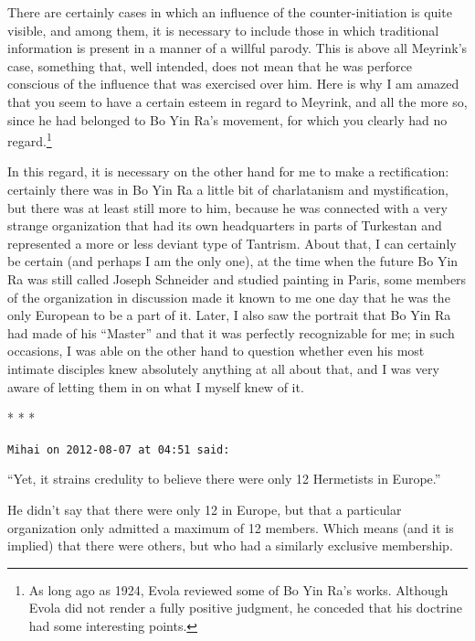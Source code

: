 There are certainly cases in which an influence of the counter-initiation is quite visible, and among them, it is necessary to include those in which traditional information is present in a manner of a willful parody. This is above all Meyrink's case, something that, well intended, does not mean that he was perforce conscious of the influence that was exercised over him. Here is why I am amazed that you seem to have a certain esteem in regard to Meyrink, and all the more so, since he had belonged to Bo Yin Ra's movement, for which you clearly had no regard.\footnote{As long ago as 1924, Evola reviewed some of Bo Yin Ra's works. Although Evola did not render a fully positive judgment, he conceded that his doctrine had some interesting points.}

In this regard, it is necessary on the other hand for me to make a rectification: certainly there was in Bo Yin Ra a little bit of charlatanism and mystification, but there was at least still more to him, because he was connected with a very strange organization that had its own headquarters in parts of Turkestan and represented a more or less deviant type of Tantrism. About that, I can certainly be certain (and perhaps I am the only one), at the time when the future Bo Yin Ra was still called Joseph Schneider and studied painting in Paris, some members of the organization in discussion made it known to me one day that he was the only European to be a part of it. Later, I also saw the portrait that Bo Yin Ra had made of his ``Master'' and that it was perfectly recognizable for me; in such occasions, I was able on the other hand to question whether even his most intimate disciples knew absolutely anything at all about that, and I was very aware of letting them in on what I myself knew of it.



\begin{center}* * *\end{center}

\begin{footnotesize}
\begin{sffamily}
\texttt{Mihai on 2012-08-07 at 04:51 said:}

``Yet, it strains credulity to believe there were only 12 Hermetists in Europe.''

He didn't say that there were only 12 in Europe, but that a particular organization only admitted a maximum of 12 members. Which means (and it is implied) that there were others, but who had a similarly exclusive membership.


\hfill

\end{sffamily}
\end{footnotesize}

